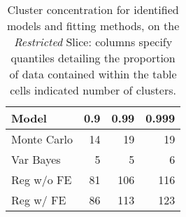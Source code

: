 \begin{table}[ht]
\centering
\begin{tabular}{lrrr}
  \hline
Model & 0.9 & 0.99 & 0.999 \\ 
  \hline
Monte Carlo & 14 & 19 & 19 \\ 
  Var Bayes & 5 & 5 & 6 \\ 
  Reg w/o FE & 81 & 106 & 116 \\ 
  Reg w/ FE & 86 & 113 & 123 \\ 
   \hline
\end{tabular}
\caption{Cluster concentration for identified models and fitting 
        methods, on the \emph{Restricted} Slice: columns specify quantiles 
        detailing the proportion of data contained within the table cells 
        indicated number of clusters.\label{tab:cluster_concentration}} 
\end{table}
